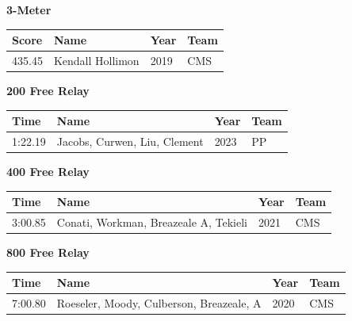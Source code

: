 \vspace{1.2em}
\noindent\begin{minipage}[t]{0.98\textwidth}
\centering
\textbf{\textcolor{teamprimary}{3-Meter}}\par
\vspace{0.5em}
\centering
\small
\renewcommand{\arraystretch}{1.0}
\setlength{\tabcolsep}{4pt}
\begin{tabular}{@{}p{2.5cm}p{4.5cm}p{1.5cm}p{2.5cm}@{}}
\toprule
\textbf{Score} & \textbf{Name} & \textbf{Year} & \textbf{Team} \\
\midrule
435.45 & Kendall Hollimon & 2019 & CMS \\
\bottomrule
\end{tabular}
\end{minipage}
\vspace{1.2em}
\noindent\begin{minipage}[t]{0.98\textwidth}
\centering
\textbf{\textcolor{teamprimary}{200 Free Relay}}\par
\vspace{0.5em}
\centering
\small
\renewcommand{\arraystretch}{1.0}
\setlength{\tabcolsep}{4pt}
\begin{tabular}{@{}p{2.7cm}p{4.3cm}p{1.6cm}p{2.7cm}@{}}
\toprule
\textbf{Time} & \textbf{Name} & \textbf{Year} & \textbf{Team} \\
\midrule
1:22.19 & Jacobs, Curwen, Liu, Clement & 2023 & PP \\
\bottomrule
\end{tabular}
\end{minipage}
\vspace{1.2em}
\noindent\begin{minipage}[t]{0.98\textwidth}
\centering
\textbf{\textcolor{teamprimary}{400 Free Relay}}\par
\vspace{0.5em}
\centering
\small
\renewcommand{\arraystretch}{1.0}
\setlength{\tabcolsep}{4pt}
\begin{tabular}{@{}p{2.7cm}p{4.3cm}p{1.6cm}p{2.7cm}@{}}
\toprule
\textbf{Time} & \textbf{Name} & \textbf{Year} & \textbf{Team} \\
\midrule
3:00.85 & Conati, Workman, Breazeale A, Tekieli & 2021 & CMS \\
\bottomrule
\end{tabular}
\end{minipage}
\vspace{1.2em}
\noindent\begin{minipage}[t]{0.98\textwidth}
\centering
\textbf{\textcolor{teamprimary}{800 Free Relay}}\par
\vspace{0.5em}
\centering
\small
\renewcommand{\arraystretch}{1.0}
\setlength{\tabcolsep}{4pt}
\begin{tabular}{@{}p{2.7cm}p{4.3cm}p{1.6cm}p{2.7cm}@{}}
\toprule
\textbf{Time} & \textbf{Name} & \textbf{Year} & \textbf{Team} \\
\midrule
7:00.80 & Roeseler, Moody, Culberson, Breazeale, A & 2020 & CMS \\
\bottomrule
\end{tabular}
\end{minipage}
